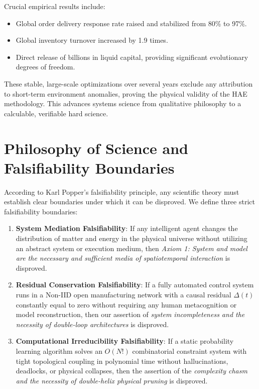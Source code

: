 \documentclass[11pt,a4paper]{article}
\begin{document}
Crucial empirical results include:
\begin{itemize}
    \item Global order delivery response rate raised and stabilized from 80\% to 97\%.
    \item Global inventory turnover increased by 1.9 times.
    \item Direct release of billions in liquid capital, providing significant evolutionary degrees of freedom.
\end{itemize}
These stable, large-scale optimizations over several years exclude any attribution to short-term environment anomalies, proving the physical validity of the HAE methodology. This advances systems science from qualitative philosophy to a calculable, verifiable hard science.

\section{Philosophy of Science and Falsifiability Boundaries}
\label{sec:philosophy-falsifiability}

According to Karl Popper's falsifiability principle, any scientific theory must establish clear boundaries under which it can be disproved. We define three strict falsifiability boundaries:
\begin{enumerate}
    \item \textbf{System Mediation Falsifiability}: If any intelligent agent changes the distribution of matter and energy in the physical universe without utilizing an abstract system or execution medium, then \emph{Axiom 1: System and model are the necessary and sufficient media of spatiotemporal interaction} is disproved.
    \item \textbf{Residual Conservation Falsifiability}: If a fully automated control system runs in a Non-IID open manufacturing network with a causal residual $\Delta(t)$ constantly equal to zero without requiring any human metacognition or model reconstruction, then our assertion of \emph{system incompleteness and the necessity of double-loop architectures} is disproved.
    \item \textbf{Computational Irreducibility Falsifiability}: If a static probability learning algorithm solves an $O(N!)$ combinatorial constraint system with tight topological coupling in polynomial time without hallucinations, deadlocks, or physical collapses, then the assertion of the \emph{complexity chasm and the necessity of double-helix physical pruning} is disproved.
\end{enumerate}
\end{document}
